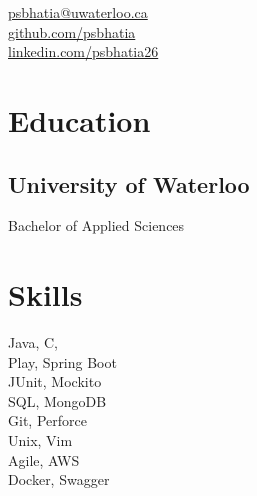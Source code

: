 \documentclass[]{hieudo-build}
\begin{document}
%
%
\color{myyellow}
{
	\color{myblue}\faEnvelope \href{mailto:psbhatia@uwaterloo.ca}{ psbhatia@uwaterloo.ca}\\
	\faGithub \href{https://github.com/psbhatia}{   github.com/psbhatia}\\
	\faLinkedinSquare \href{https://www.linkedin.com/in/psbhatia26}{   linkedin.com/psbhatia26}
}
    
%
%
\begin{minipage}[t]{0.34\textwidth}
\section{Education} 

\subsection{University of Waterloo}
Bachelor of Applied Sciences \\
\sectionsep


\section{Skills}
Java, C, \\ 

Play, Spring Boot\\
JUnit, Mockito\\

SQL, MongoDB\\

Git, Perforce \\
Unix, Vim \\ 
Agile, AWS \\ 
Docker, Swagger \\

\sectionsep



\end{minipage}
\end{document}
